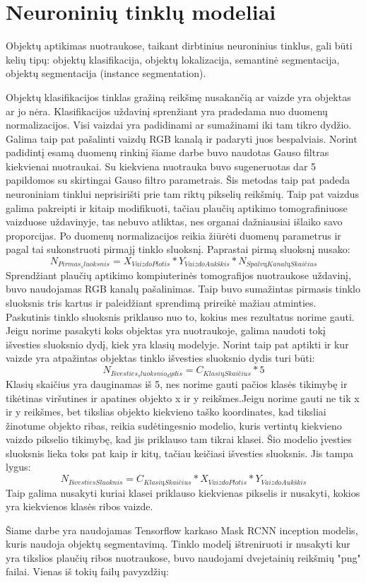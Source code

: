 \documentclass{VUMIFInfKursinis}
\begin{document}
\section{Neuroninių tinklų modeliai}
\par
Objektų aptikimas nuotraukose, taikant dirbtinius neuroninius tinklus, gali būti kelių
tipų: objektų klasifikacija, objektų lokalizacija, semantinė segmentacija,
objektų segmentacija (instance segmentation).
 \par
 Objektų klasifikacijos tinklas gražiną reikšmę nusakančią ar vaizde yra objektas
 ar jo nėra. Klasifikacijos uždavinį sprenžiant yra pradedama nuo duomenų normalizacijos.
 Visi vaizdai yra padidinami ar sumažinami iki tam tikro dydžio. Galima taip pat pašalinti
 vaizdų RGB kanalą ir padaryti juos bespalviais. Norint padidintį esamą duomenų rinkinį šiame
 darbe buvo naudotas Gauso filtras kiekvienai nuotraukai. Su kiekviena nuotrauka buvo sugeneruotas dar
 5 papildomos su skirtingai Gauso filtro parametrais. Šis metodas taip pat padeda neuroniniam
 tinklui neprisirišti prie tam riktų pikselių reikšmių. Taip pat vaizdus galima pakreipti ir kitaip
 modifikuoti, tačiau plaučių aptikimo tomografiniuose vaizduose uždavinyje, tas nebuvo
 atliktas, nes organai dažniausiai išlaiko savo proporcijas. Po duomenų normalizacijos reikia
 žiūrėti duomenų parametrus ir pagal tai sukonstruoti pirmajį tinklo sluoksnį. Paprastai pirmą sluoksnį
 nusako:
 \[
N_{Pirmas_sluoksnis} = X_{VaizdoPlotis} * Y_{VaizdoAukškis} * N_{SpalvųKanalųSkaičius}
 \]
Sprendžiant plaučių aptikimo kompiuterinės tomografijos nuotraukose uždavinį, buvo naudojamas
RGB kanalų pašalinimas. Taip buvo sumažintas pirmasis tinklo sluoksnis tris kartus ir paleidžiant
sprendimą prireikė mažiau atminties. Paskutinis tinklo sluoksnis priklauso nuo to, kokius mes
rezultatus norime gauti. Jeigu norime pasakyti koks objektas yra nuotraukoje, galima naudoti
tokį išvesties sluoksnio dydį, kiek yra klasių modelyje. Norint taip pat aptikti ir kur
vaizde yra atpažintas objektas tinklo išvesties sluoksnio dydis turi būti:
\[
  N_{Išvesties_sluoksnio_dydis} = C_{KlasiųSkaičius}*5
\]
Klasių skaičius yra dauginamas iš 5, nes norime gauti pačios klasės tikimybę ir tikėtinas
viršutines ir apatines objekto x ir y reikšmes.Jeigu norime gauti ne tik x ir y reikšmes, bet tikslias
objekto kiekvieno taško koordinates, kad tiksliai žinotume objekto ribas, reikia sudėtingesnio modelio,
kuris vertintų kiekvieno vaizdo pikselio tikimybę, kad jis priklauso tam tikrai klasei.
Šio modelio įvesties sluoksnis lieka toks pat kaip ir kitų, tačiau keičiasi išvesties sluoksnis. Jis tampa
lygus:
\[
N_{IšvestiesSluoknis} = C_{KlasiųSkaičius} * X_{VaizdoPlotis} * Y_{VaizdoAukškis}
\]
Taip galima nusakyti kuriai klasei priklauso kiekvienas pikselis ir nusakyti, kokios yra
kiekvienos klasės ribos vaizde.
\par
Šiame darbe yra naudojamas Tensorflow karkaso Mask RCNN inception modelis, kuris naudoja
objektų segmentavimą. Tinklo modelį ištreniruoti ir nusakyti kur yra tikslios plaučių
ribos nuotraukose, buvo naudojami dvejetainių reikšmių "png" failai. Vienas iš tokių
failų pavyzdžių:
\end{document}
